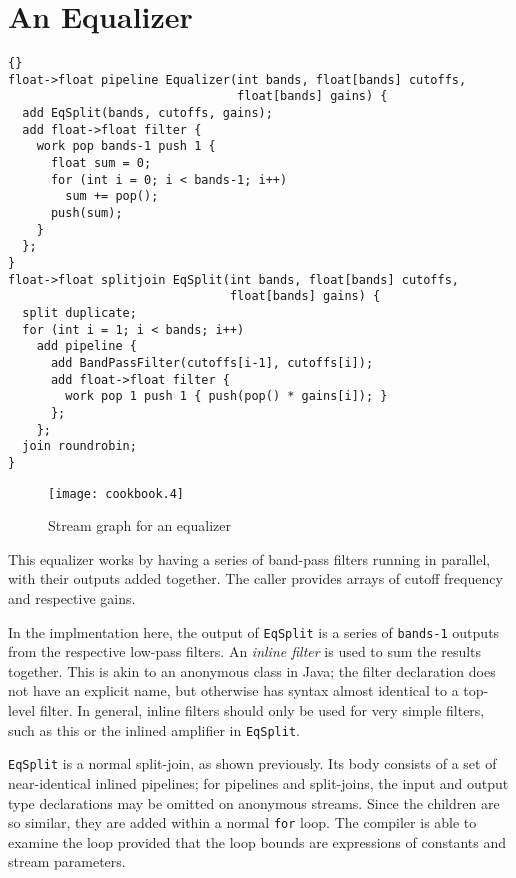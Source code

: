 \section{An Equalizer}

\begin{lstlisting}{}
float->float pipeline Equalizer(int bands, float[bands] cutoffs,
                                float[bands] gains) {
  add EqSplit(bands, cutoffs, gains);
  add float->float filter {
    work pop bands-1 push 1 {
      float sum = 0;
      for (int i = 0; i < bands-1; i++)
        sum += pop();
      push(sum);
    }
  };
}
float->float splitjoin EqSplit(int bands, float[bands] cutoffs,
                               float[bands] gains) {
  split duplicate;
  for (int i = 1; i < bands; i++)
    add pipeline {
      add BandPassFilter(cutoffs[i-1], cutoffs[i]);
      add float->float filter {
        work pop 1 push 1 { push(pop() * gains[i]); }
      };
    };
  join roundrobin;
}
\end{lstlisting}

\begin{figure}[htbp]
  \begin{center}
    \texttt{[image: cookbook.4]}
    \caption{Stream graph for an equalizer}
    \label{fig:equalizer}
  \end{center}
\end{figure}

This equalizer works by having a series of band-pass filters running
in parallel, with their outputs added together.  The caller provides
arrays of cutoff frequency and respective gains.

In the implmentation here, the output of \lstinline|EqSplit| is a
series of \lstinline|bands-1| outputs from the respective low-pass
filters.  An \emph{inline filter} is used to sum the results
together.  This is akin to an anonymous class in Java; the filter
declaration does not have an explicit name, but otherwise has syntax
almost identical to a top-level filter.  In general, inline filters
should only be used for very simple filters, such as this or the
inlined amplifier in \lstinline|EqSplit|.

\lstinline|EqSplit| is a normal split-join, as shown previously.  Its
body consists of a set of near-identical inlined pipelines; for
pipelines and split-joins, the input and output type declarations may
be omitted on anonymous streams.  Since the children are so similar,
they are added within a normal \lstinline|for| loop.  The compiler is
able to examine the loop provided that the loop bounds are expressions
of constants and stream parameters.
